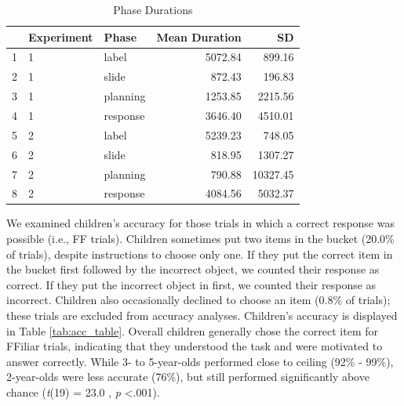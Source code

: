 \documentclass[a4paper,man,apacite,floatsintext]{apa6}
\begin{document}
\begin{table}[b]
\centering
\begin{tabular}{rllrr}
  \hline
 & Experiment & Phase & Mean Duration & SD \\ 
  \hline
1 & 1 & label & 5072.84 & 899.16 \\ 
  2 & 1 & slide & 872.43 & 196.83 \\ 
  3 & 1 & planning & 1253.85 & 2215.56 \\ 
  4 & 1 & response & 3646.40 & 4510.01 \\ 
   \hline
5 & 2 & label & 5239.23 & 748.05 \\ 
  6 & 2 & slide & 818.95 & 1307.27 \\ 
  7 & 2 & planning & 790.88 & 10327.45 \\ 
  8 & 2 & response & 4084.56 & 5032.37 \\ 
   \hline
\end{tabular}
\caption{Phase Durations} 
\label{tab:phases}
\end{table}

We examined children's accuracy for those trials in which a correct
response was possible (i.e., FF trials). Children sometimes put two
items in the bucket (20.0\% of trials), despite instructions to choose
only one. If they put the correct item in the bucket first followed by
the incorrect object, we counted their response as correct. If they put
the incorrect object in first, we counted their response as incorrect.
Children also occasionally declined to choose an item (0.8\% of trials);
these trials are excluded from accuracy analyses. Children's accuracy is
displayed in Table \ref{tab:acc_table}. Overall children generally chose
the correct item for FFiliar trials, indicating that they understood the
task and were motivated to answer correctly. While 3- to 5-year-olds
performed close to ceiling (92\% - 99\%), 2-year-olds were less accurate
(76\%), but still performed significantly above chance (\emph{t}(19) =
23.0 , \emph{p} \textless{}.001).
\end{document}
